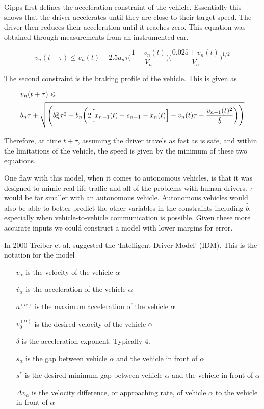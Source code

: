 Gipps first defines the acceleration constraint of the vehicle. Essentially this shows that the driver accelerates until they are close to their target speed. The driver then reduces their acceleration until it reaches zero. This equation was obtained through measurements from an instrumented car.

\begin{equation*}
v_n(t+\tau) \leqslant v_n(t) + 2.5a_n\tau\Biggl(\frac{1 - v_n(t)}{V_n}\Biggr)\Biggl(\frac{0.025 + v_n(t)}{V_n}\Biggr)^{1/2}
\end{equation*}

The second constraint is the braking profile of the vehicle. This is given as

\begin{equation*}
\begin{split}
&v_n(t+\tau) \leqslant \\
&b_n\tau + \sqrt{\Biggl(b_n^2\tau^2 - b_n\biggl(2\Bigl[x_{n-1}(t) - s_{n-1} - x_n(t)\Bigr] - v_n(t)\tau - \frac{v_{n-1}(t)^2}{\hat{b}}\biggr)\Biggr)}
\end{split}
\end{equation*}

Therefore, at time $t + \tau$, assuming the driver travels as fast as is safe, and within the limitations of the vehicle, the speed is given by the minimum of these two equations.

One flaw with this model, when it comes to autonomous vehicles, is that it was designed to mimic real-life traffic and all of the problems with human drivers. $\tau$ would be far smaller with an autonomous vehicle. Autonomous vehicles would also be able to better predict the other variables in the constraints including $\hat{b}$, especially when vehicle-to-vehicle communication is possible. Given these more accurate inputs we could construct a model with lower margins for error.

In 2000 Treiber et al. suggested the `Intelligent Driver Model' (IDM). This is the notation for the model

\begin{itemize}
\item[$v_\alpha$] is the velocity of the vehicle $\alpha$
\item[$\dot{v_\alpha}$] is the acceleration of the vehicle $\alpha$
\item[$a^{(\alpha)}$] is the maximum acceleration of the vehicle $\alpha$
\item[$v_0^{(\alpha)}$] is the desired velocity of the vehicle $\alpha$
\item[$\delta$] is the acceleration exponent. Typically 4.
\item[$s_\alpha$] is the gap between vehicle $\alpha$ and the vehicle in front of $\alpha$
\item[$s^*$] is the desired minimum gap between vehicle $\alpha$ and the vehicle in front of $\alpha$
\item[$\Delta v_\alpha$] is the velocity difference, or approaching rate, of vehicle $\alpha$ to the vehicle in front of $\alpha$
\end{itemize}

